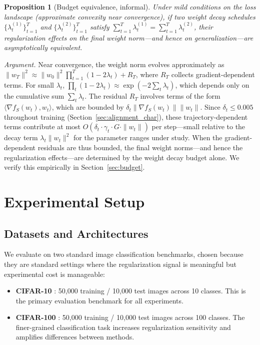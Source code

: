 \documentclass{article}
\newtheorem{proposition}{Proposition}
\begin{document}
\begin{proposition}[Budget equivalence, informal]
  \label{prop:budget}
  Under mild conditions on the loss landscape (approximate convexity near
  convergence), if two weight decay schedules $\{\lambda_t^{(1)}\}_{t=1}^T$ and
  $\{\lambda_t^{(2)}\}_{t=1}^T$ satisfy
  $\sum_{t=1}^T \lambda_t^{(1)} = \sum_{t=1}^T \lambda_t^{(2)}$,
  their regularization effects on the final weight norm---and hence on
  generalization---are asymptotically equivalent.
\end{proposition}

\emph{Argument.}
Near convergence, the weight norm evolves approximately as
$\|w_T\|^2 \approx \|w_0\|^2 \prod_{t=1}^T (1 - 2\lambda_t) + R_T$, where $R_T$
collects gradient-dependent terms.
For small $\lambda_t$,
$\prod_t (1 - 2\lambda_t) \approx \exp(-2\sum_t \lambda_t)$,
which depends only on the cumulative sum $\sum_t \lambda_t$.
The residual $R_T$ involves terms of the form $\langle \nabla f_S(w_t), w_t \rangle$,
which are bounded by $\delta_t \|\nabla f_S(w_t)\| \|w_t\|$.
Since $\delta_t \leq 0.005$ throughout training
(Section~\ref{sec:alignment_char}), these trajectory-dependent terms contribute at
most $O(\delta_t \cdot \gamma_t \cdot G \cdot \|w_t\|)$ per step---small relative
to the decay term $\lambda_t \|w_t\|^2$ for the parameter ranges under study.
When the gradient-dependent residuals are thus bounded, the final weight norms---and
hence the regularization effects---are determined by the weight decay budget alone.
We verify this empirically in Section~\ref{sec:budget}.

\section{Experimental Setup}
\label{sec:experiments}

\subsection{Datasets and Architectures}

We evaluate on two standard image classification benchmarks, chosen because they are
standard settings where the regularization signal is meaningful but experimental cost
is manageable:
\begin{itemize}
  \item \textbf{CIFAR-10} \citep{krizhevsky2009learning}: 50,000 training / 10,000
        test images across 10 classes.
        This is the primary evaluation benchmark for all experiments.
  \item \textbf{CIFAR-100} \citep{krizhevsky2009learning}: 50,000 training / 10,000
        test images across 100 classes.
        The finer-grained classification task increases regularization sensitivity
        and amplifies differences between methods.
\end{itemize}
\end{document}
